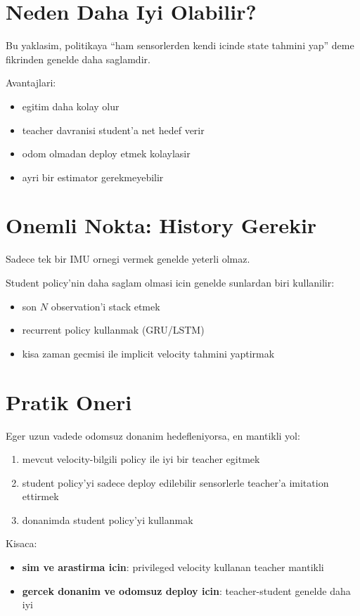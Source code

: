\documentclass[11pt,a4paper]{article}
\begin{document}
\section{Neden Daha Iyi Olabilir?}
Bu yaklasim, politikaya ``ham sensorlerden kendi icinde state tahmini yap'' deme fikrinden genelde daha saglamdir.

Avantajlari:
\begin{itemize}
  \item egitim daha kolay olur
  \item teacher davranisi student'a net hedef verir
  \item odom olmadan deploy etmek kolaylasir
  \item ayri bir estimator gerekmeyebilir
\end{itemize}

\section{Onemli Nokta: History Gerekir}
Sadece tek bir IMU ornegi vermek genelde yeterli olmaz.

\noindent
Student policy'nin daha saglam olmasi icin genelde sunlardan biri kullanilir:
\begin{itemize}
  \item son \(N\) observation'i stack etmek
  \item recurrent policy kullanmak (GRU/LSTM)
  \item kisa zaman gecmisi ile implicit velocity tahmini yaptirmak
\end{itemize}

\section{Pratik Oneri}
Eger uzun vadede odomsuz donanim hedefleniyorsa, en mantikli yol:
\begin{enumerate}
  \item mevcut velocity-bilgili policy ile iyi bir teacher egitmek
  \item student policy'yi sadece deploy edilebilir sensorlerle teacher'a imitation ettirmek
  \item donanimda student policy'yi kullanmak
\end{enumerate}

\noindent
Kisaca:
\begin{itemize}
  \item \textbf{sim ve arastirma icin}: privileged velocity kullanan teacher mantikli
  \item \textbf{gercek donanim ve odomsuz deploy icin}: teacher-student genelde daha iyi
\end{itemize}
\end{document}
